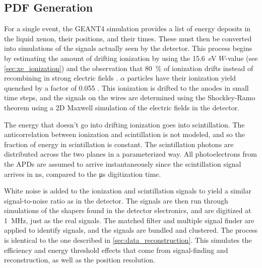 \documentclass[herrin-thesis.tex]{subfiles}
\begin{document}


\subsection{PDF Generation}
For a single event, the GEANT4 simulation provides a list of energy deposits in the liquid xenon, their positions, and their times. These must then be converted into simulations of the signals actually seen by the detector. This process begins by estimating the amount of drifting ionization by using the \SI{15.6}{\eV} \(W\)-value (see \cref{sec:xe_ionization}) and the observation that \about{}\SI{80}{\percent} of ionization drifts instead of recombining in strong electric fields \cite{Aprile:1991fk}. \(\alpha\) particles have their ionization yield quenched by a factor of 0.055 \cite{Aprile:1991uq}. This ionization is drifted to the anodes in small time steps, and the signals on the wires are determined using the Shockley-Ramo theorem using a 2D Maxwell \cite{Maxwell} simulation of the electric fields in the detector.

The energy that doesn't go into drifting ionization goes into scintillation. The anticorrelation between ionization and scintillation is not modeled, and so the fraction of energy in scintillation is constant. The scintillation photons are distributed across the two planes in a parameterized way. All photoelectrons from the APDs are assumed to arrive instantaneously since the scintillation signal arrives in \si{\ns}, compared to the \si{\micro\s} digitization time.

White noise is added to the ionization and scintillation signals to yield a similar signal-to-noise ratio as in the detector. The signals are then run through simulations of the shapers found in the detector electronics, and are digitized at \SI{1}{\MHz}, just as the real signals. The matched filter and multiple signal finder are applied to identify signals, and the signals are bundled and clustered. The process is identical to the one described in \cref{sec:data_reconstruction}. This simulates the efficiency and energy threshold effects that come from signal-finding and reconstruction, as well as the position resolution.
\end{document}
